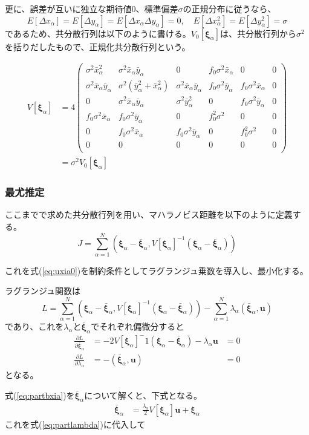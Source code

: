 \documentclass[12pt,a4j]{jsarticle}
\newcommand{\bxa}{\bar{x}_\alpha}
\newcommand{\dxa}{\Delta x_\alpha}
\newcommand{\bya}{\bar{y}_\alpha}
\newcommand{\dya}{\Delta y_\alpha}
\newcommand{\xia}{\bm{\xi}_\alpha}
\newcommand{\bxia}{\bar{\bm{\xi}}_\alpha}
\begin{document}
      更に、誤差が互いに独立な期待値$0$、標準偏差$\sigma$の正規分布に従うなら、
      \begin{equation}
        E[\dxa] = E[\dya] = E[\dxa\dya] = 0, \quad E[\dxa^2] = E[\dya^2] = \sigma
      \end{equation}
      であるため、共分散行列は以下のように書ける。$V_0[\xia]$は、共分散行列から$\sigma^2$を括りだしたもので、正規化共分散行列という。

      \begin{align}
        V[\xia] &= 4 \begin{pmatrix}
          \sigma^2\bxa^2 & \sigma^2\bxa\bya & 0 & f_0\sigma^2\bxa & 0 & 0 \\
          \sigma^2\bxa\bya & \sigma^2(\bya^2 + \bxa^2) & \sigma^2\bxa\bya & f_0\sigma^2\bya & f_0\sigma^2\bxa & 0 \\
          0 & \sigma^2\bxa\bya & \sigma^2\bya^2 & 0 & f_0\sigma^2\bya & 0 \\
          f_0\sigma^2\bxa & f_0\sigma^2\bya & 0 & f_0^2\sigma^2 & 0 & 0 \\
          0 & f_0\sigma^2\bxa & f_0\sigma^2\bya & 0 & f_0^2\sigma^2 & 0 \\
          0 & 0 & 0 & 0 & 0 & 0 \\
        \end{pmatrix} \\
         &= \sigma^2 V_0[\xia] 
      \end{align}
    
    \subsubsection*{最尤推定}
      ここまでで求めた共分散行列を用い、マハラノビス距離を以下のように定義する。
      \begin{equation}
        J = \sum_{\alpha = 1}^N \left(\xia - \bxia, V[\xia]^{-1} (\xia - \bxia) \right)
      \end{equation}
      
      これを式(\ref{eq:uxia0})を制約条件としてラグランジュ乗数を導入し、最小化する。\par
      ラグランジュ関数は
      \begin{equation}
        L = \sum_{\alpha = 1}^N \left(\xia - \bxia, V[\xia]^{-1} (\xia - \bxia) \right) - \sum_{\alpha = 1}^N \lambda_\alpha (\bxia, \bm{u})
      \end{equation}
      であり、これを$\lambda_\alpha$と$\bxia$でそれぞれ偏微分すると
      \begin{align}
        \frac{\partial L}{\partial \bxia} &= -2V[\xia]^-1(\xia - \bxia) - \lambda_\alpha\bm{u} &= 0 \label{eq:partbxia} \\
        \frac{\partial L}{\partial \lambda_\alpha} &= -(\bxia, \bm{u}) &= 0 \label{eq:partlambda}
      \end{align}
      となる。

      式(\ref{eq:partbxia})を$\bxia$について解くと、下式となる。
      \begin{align}
        \bxia &= \frac{\lambda_a}{2}V[\xia]\bm{u} + \xia 
      \end{align}
      これを式(\ref{eq:partlambda})に代入して
\end{document}
